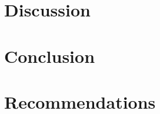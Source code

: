 \documentclass[12pt,titlepage]{article}
\begin{document}

%

\section{Discussion}


\section{Conclusion}


\section{Recommendations}



\end{document}
